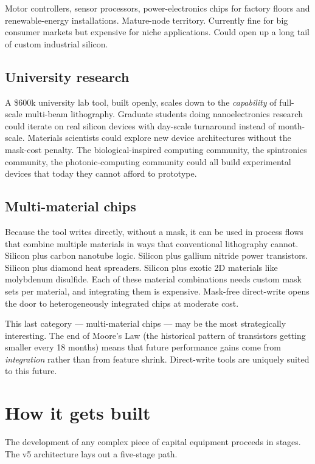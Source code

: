 \documentclass[11pt,letterpaper]{article}
\begin{document}
Motor controllers, sensor processors, power-electronics chips for factory floors and renewable-energy installations. Mature-node territory. Currently fine for big consumer markets but expensive for niche applications. Could open up a long tail of custom industrial silicon.

\subsection{University research}

A \$600k university lab tool, built openly, scales down to the \emph{capability} of full-scale multi-beam lithography. Graduate students doing nanoelectronics research could iterate on real silicon devices with day-scale turnaround instead of month-scale. Materials scientists could explore new device architectures without the mask-cost penalty. The biological-inspired computing community, the spintronics community, the photonic-computing community could all build experimental devices that today they cannot afford to prototype.

\subsection{Multi-material chips}

Because the tool writes directly, without a mask, it can be used in process flows that combine multiple materials in ways that conventional lithography cannot. Silicon plus carbon nanotube logic. Silicon plus gallium nitride power transistors. Silicon plus diamond heat spreaders. Silicon plus exotic 2D materials like molybdenum disulfide. Each of these material combinations needs custom mask sets per material, and integrating them is expensive. Mask-free direct-write opens the door to heterogeneously integrated chips at moderate cost.

This last category --- multi-material chips --- may be the most strategically interesting. The end of Moore's Law (the historical pattern of transistors getting smaller every 18 months) means that future performance gains come from \emph{integration} rather than from feature shrink. Direct-write tools are uniquely suited to this future.

\section{How it gets built}

The development of any complex piece of capital equipment proceeds in stages. The v5 architecture lays out a five-stage path.
\end{document}
